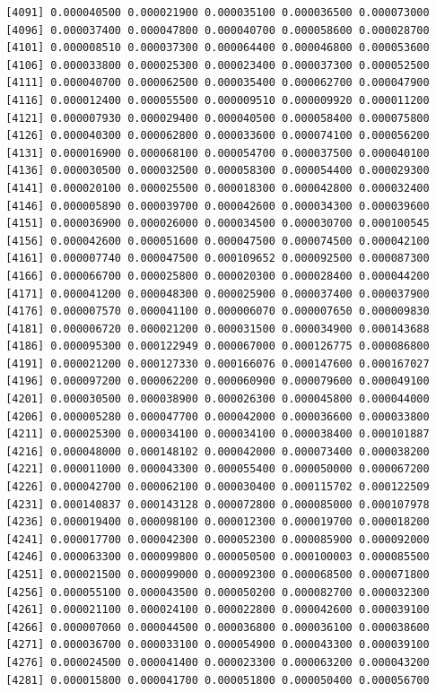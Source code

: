 \documentclass[]{article}
\begin{document}
\begin{verbatim}
 [4091] 0.000040500 0.000021900 0.000035100 0.000036500 0.000073000
 [4096] 0.000037400 0.000047800 0.000040700 0.000058600 0.000028700
 [4101] 0.000008510 0.000037300 0.000064400 0.000046800 0.000053600
 [4106] 0.000033800 0.000025300 0.000023400 0.000037300 0.000052500
 [4111] 0.000040700 0.000062500 0.000035400 0.000062700 0.000047900
 [4116] 0.000012400 0.000055500 0.000009510 0.000009920 0.000011200
 [4121] 0.000007930 0.000029400 0.000040500 0.000058400 0.000075800
 [4126] 0.000040300 0.000062800 0.000033600 0.000074100 0.000056200
 [4131] 0.000016900 0.000068100 0.000054700 0.000037500 0.000040100
 [4136] 0.000030500 0.000032500 0.000058300 0.000054400 0.000029300
 [4141] 0.000020100 0.000025500 0.000018300 0.000042800 0.000032400
 [4146] 0.000005890 0.000039700 0.000042600 0.000034300 0.000039600
 [4151] 0.000036900 0.000026000 0.000034500 0.000030700 0.000100545
 [4156] 0.000042600 0.000051600 0.000047500 0.000074500 0.000042100
 [4161] 0.000007740 0.000047500 0.000109652 0.000092500 0.000087300
 [4166] 0.000066700 0.000025800 0.000020300 0.000028400 0.000044200
 [4171] 0.000041200 0.000048300 0.000025900 0.000037400 0.000037900
 [4176] 0.000007570 0.000041100 0.000006070 0.000007650 0.000009830
 [4181] 0.000006720 0.000021200 0.000031500 0.000034900 0.000143688
 [4186] 0.000095300 0.000122949 0.000067000 0.000126775 0.000086800
 [4191] 0.000021200 0.000127330 0.000166076 0.000147600 0.000167027
 [4196] 0.000097200 0.000062200 0.000060900 0.000079600 0.000049100
 [4201] 0.000030500 0.000038900 0.000026300 0.000045800 0.000044000
 [4206] 0.000005280 0.000047700 0.000042000 0.000036600 0.000033800
 [4211] 0.000025300 0.000034100 0.000034100 0.000038400 0.000101887
 [4216] 0.000048000 0.000148102 0.000042000 0.000073400 0.000038200
 [4221] 0.000011000 0.000043300 0.000055400 0.000050000 0.000067200
 [4226] 0.000042700 0.000062100 0.000030400 0.000115702 0.000122509
 [4231] 0.000140837 0.000143128 0.000072800 0.000085000 0.000107978
 [4236] 0.000019400 0.000098100 0.000012300 0.000019700 0.000018200
 [4241] 0.000017700 0.000042300 0.000052300 0.000085900 0.000092000
 [4246] 0.000063300 0.000099800 0.000050500 0.000100003 0.000085500
 [4251] 0.000021500 0.000099000 0.000092300 0.000068500 0.000071800
 [4256] 0.000055100 0.000043500 0.000050200 0.000082700 0.000032300
 [4261] 0.000021100 0.000024100 0.000022800 0.000042600 0.000039100
 [4266] 0.000007060 0.000044500 0.000036800 0.000036100 0.000038600
 [4271] 0.000036700 0.000033100 0.000054900 0.000043300 0.000039100
 [4276] 0.000024500 0.000041400 0.000023300 0.000063200 0.000043200
 [4281] 0.000015800 0.000041700 0.000051800 0.000050400 0.000056700

\end{verbatim}
\end{document}
